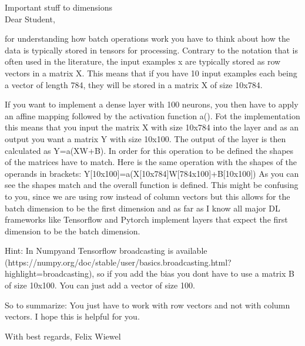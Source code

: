 Important stuff to dimensions\\
Dear Student,

for understanding how batch operations work you have to think about how the data is typically stored in tensors for processing. Contrary to the notation that is often used in the literature, the input examples x are typically stored as row vectors in a matrix X. This means that if you have 10 input examples each being a vector of length 784, they will be stored in a matrix X of size 10x784.

If you want to implement a dense layer with 100 neurons, you then have to apply an affine mapping followed by the activation function a(). Fot the implementation this means that you input the matrix X with size 10x784 into the layer and as an output you want a matrix Y with size 10x100. The output of the layer is then calculated as Y=a(XW+B). In order for this operation to be defined the shapes of the matrices have to match. Here is the same operation with the shapes of the operands in brackets: Y[10x100]=a(X[10x784]W[784x100]+B[10x100]) As you can see the shapes match and the overall function is defined. This might be confusing to you, since we are using row instead of column vectors but this allows for the batch dimension to be the first dimension and as far as I know all major DL frameworks like Tensorflow and Pytorch implement layers that expect the first dimension to be the batch dimension.

Hint: In Numpyand Tensorflow broadcasting is available (https://numpy.org/doc/stable/user/basics.broadcasting.html?highlight=broadcasting), so if you add the bias you dont have to use a matrix B of size 10x100. You can just add a vector of size 100.

So to summarize: You just have to work with row vectors and not with column vectors. I hope this is helpful for you.

With best regards,
Felix Wiewel
